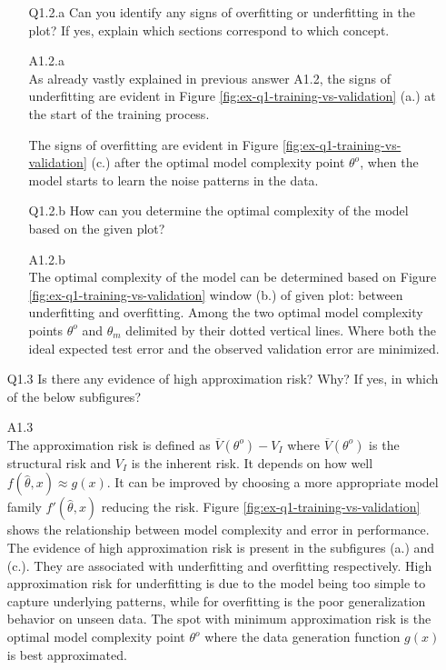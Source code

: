 \documentclass[unicode, 11pt, a4paper]{scrartcl}
\begin{document}
\begin{itemize}
	      \begin{itemize}
		      \item[Q1.2.a] Can you identify any signs of overfitting or underfitting in the plot?
		            If yes, explain which sections correspond to which concept.

		      \item[A1.2.a] ~\\
		            As already vastly explained in previous answer A1.2,
		            the signs of underfitting are evident in Figure \ref{fig:ex-q1-training-vs-validation}
		            (a.) at the start of the training process.

		            The signs of overfitting are evident in Figure \ref{fig:ex-q1-training-vs-validation}
		            (c.) after the optimal model complexity point $\theta^o$,
		            when the model starts to learn the noise patterns in the data.

		      \item[Q1.2.b] How can you determine the optimal complexity of the model based on the given plot?

		      \item[A1.2.b] ~\\
		            The optimal complexity of the model can be determined based on
		            Figure \ref{fig:ex-q1-training-vs-validation}
		            window (b.) of given plot: between underfitting and overfitting.
		            Among the two optimal model complexity points $\theta^o$ and $\theta_m$ delimited by their
		            dotted vertical lines.
		            Where both the ideal expected test error and the observed validation error are minimized.
	      \end{itemize}

	\item[Q1.3] Is there any evidence of high approximation risk? Why?
	      If yes, in which of the below subfigures?

	\item[A1.3] ~\\
	      The approximation risk is defined as $\overline{V}(\theta^o) - V_I$
	      where $\overline{V}(\theta^o)$ is the structural risk
	      and $V_I$ is the inherent risk.
	      It depends on how well $f(\hat{\theta}, x) \approx g(x)$.
	      It can be improved by choosing a more appropriate model family $f'(\hat{\theta}, x)$
	      reducing the risk.
	      Figure \ref{fig:ex-q1-training-vs-validation} shows the relationship between
	      model complexity and error in performance.
	      The evidence of high approximation risk is present in the subfigures (a.) and (c.).
	      They are associated with underfitting and overfitting respectively.
	      High approximation risk for underfitting is due to the model
	      being too simple to capture underlying patterns,
	      while for overfitting is the poor generalization behavior on unseen data.
	      The spot with minimum approximation risk is the optimal model complexity point $\theta^o$
	      where the data generation function $g(x)$ is best approximated.


\end{itemize}
\end{document}
